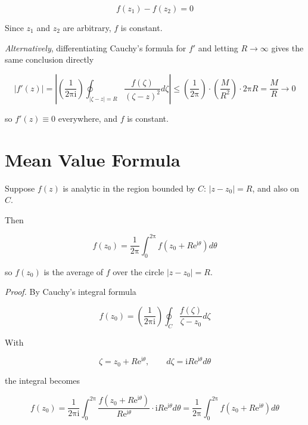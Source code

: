 \documentclass[11pt,a4paper]{article}
\theoremstyle{definition}
\theoremstyle{plain}
\begin{document}
\begin{equation}
f(z_{1}) - f(z_{2}) = 0
\end{equation}

Since $z_{1}$ and $z_{2}$ are arbitrary, $f$ is constant.

\textit{Alternatively}, differentiating Cauchy's formula for $f'$ and letting
$R \to \infty$ gives the same conclusion directly

\begin{equation}
\vert{}f'(z)\vert{} = \left\vert{}\left(\frac{1}{2\mathrm{\pi}\mathrm{i}}\right)\oint_{\vert{}\zeta - z\vert{} = R}\frac{f(\zeta)}{(\zeta - z)^{2}}d\zeta\right\vert{}
\le \left(\frac{1}{2\mathrm{\pi}}\right)\cdot\left(\frac{M}{R^{2}}\right)\cdot 2\mathrm{\pi}R = \frac{M}{R} \to 0
\end{equation}

so $f'(z) \equiv 0$ everywhere, and $f$ is constant.

\section{Mean Value Formula}

Suppose $f(z)$ is analytic in the region bounded by $C$: $\vert{}z - z_{0}\vert{} = R$, and also on $C$.

Then

\begin{equation}
f(z_{0}) = \frac{1}{2\mathrm{\pi}}\int_{0}^{2\mathrm{\pi}}f(z_{0} + R\mathrm{e}^{\mathrm{i}\theta})d\theta
\end{equation}

so $f(z_{0})$ is the average of $f$ over the circle $\vert{}z - z_{0}\vert{} = R$.

\textit{Proof.} By Cauchy’s integral formula

\begin{equation}
f(z_{0}) = \left(\frac{1}{2\mathrm{\pi}\mathrm{i}}\right)\oint_{C}\frac{f(\zeta)}{\zeta - z_{0}}d\zeta
\end{equation}

With

\begin{equation}
\zeta = z_{0} + R\mathrm{e}^{\mathrm{i}\theta}, \qquad
d\zeta = \mathrm{i}R\mathrm{e}^{\mathrm{i}\theta} d\theta
\end{equation}

the integral becomes

\begin{equation}
f(z_{0}) = \frac{1}{2\mathrm{\pi}\mathrm{i}} \int_{0}^{2\mathrm{\pi}}
\frac{f(z_{0} + R\mathrm{e}^{\mathrm{i}\theta})}{R\mathrm{e}^{\mathrm{i}\theta}}
\cdot \mathrm{i}R\mathrm{e}^{\mathrm{i}\theta} d\theta
= \frac{1}{2\mathrm{\pi}} \int_{0}^{2\mathrm{\pi}} f(z_{0} + R\mathrm{e}^{\mathrm{i}\theta}) d\theta
\end{equation}
\end{document}

